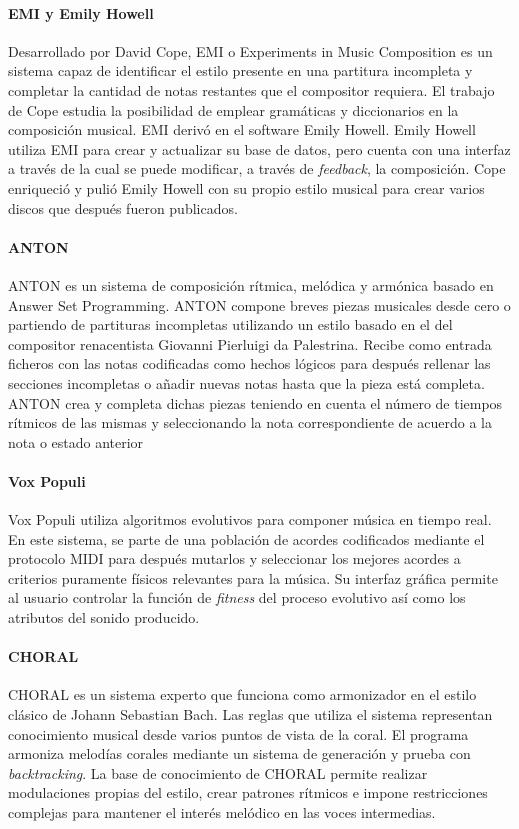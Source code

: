 \paragraph{EMI y Emily Howell}
Desarrollado por David Cope, EMI o Experiments in Music Composition es un sistema capaz de identificar el estilo presente en una partitura incompleta y completar la cantidad de notas restantes que el compositor requiera. El trabajo de Cope estudia la posibilidad de emplear gramáticas y diccionarios en la composición musical. EMI derivó en el software Emily Howell.
Emily Howell utiliza EMI para crear y actualizar su base de datos, pero cuenta con una interfaz a través de la cual se puede modificar, a través de \textit{feedback}, la composición. Cope enriqueció y pulió Emily Howell con su propio estilo musical para crear varios discos que después fueron publicados.

\paragraph{ANTON}
ANTON es un sistema de composición rítmica, melódica y armónica basado en Answer Set Programming. ANTON compone breves piezas musicales desde cero o partiendo de partituras incompletas utilizando un estilo basado en el del compositor renacentista Giovanni Pierluigi da Palestrina. Recibe como entrada ficheros con las notas codificadas como hechos lógicos para después rellenar las secciones incompletas o añadir nuevas notas hasta que la pieza está completa. ANTON crea y completa dichas piezas teniendo en cuenta el número de tiempos rítmicos de las mismas y seleccionando la nota correspondiente de acuerdo a la nota  o estado anterior

\paragraph{Vox Populi}
Vox Populi utiliza algoritmos evolutivos para componer música en tiempo real. En este sistema, se parte de una población de acordes codificados mediante el protocolo MIDI para después mutarlos y seleccionar los mejores acordes a criterios puramente físicos relevantes para la música. Su interfaz gráfica permite al usuario controlar la función de \textit{fitness} del proceso evolutivo así como los atributos del sonido producido.


\paragraph{CHORAL}
CHORAL es un sistema experto que funciona como armonizador en el estilo clásico de Johann Sebastian Bach. Las reglas que utiliza el sistema representan conocimiento musical desde varios puntos de vista de la coral. El programa armoniza melodías corales mediante un sistema de generación y prueba con \textit{backtracking}. La base de conocimiento de CHORAL permite realizar modulaciones propias del estilo, crear patrones rítmicos e impone restricciones complejas para mantener el interés melódico en las voces intermedias.

